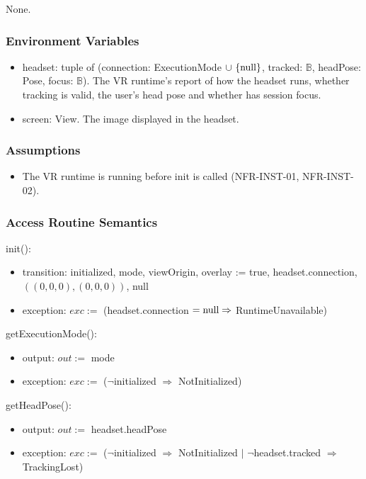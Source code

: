 \documentclass[12pt, titlepage]{article}
\newcommand{\True}{\textnormal{true}}
\newcommand{\nul}{\textnormal{null}}
\newcommand{\noinit}{$\neg$initialized $\Rightarrow$ NotInitialized}
\begin{document}
None.

\subsubsection{Environment Variables}

\begin{itemize}
\item headset: tuple of (connection: ExecutionMode $\cup \ \{\nul\}$, tracked:
  $\mathbb{B}$, headPose: Pose, focus: $\mathbb{B}$). The VR runtime's report
  of how the headset runs, whether tracking is valid, the user's head pose and
  whether \progname{} has session focus.
\item screen: View. The image displayed in the headset.
\end{itemize}

\subsubsection{Assumptions}

\begin{itemize}
\item The VR runtime is running before init is called (NFR-INST-01,
  NFR-INST-02).
\end{itemize}

\subsubsection{Access Routine Semantics}

\noindent init():
\begin{itemize}
\item transition: initialized, mode, viewOrigin, overlay := \True,
  headset.connection, $((0,0,0), (0,0,0))$, \nul
\item exception: $exc :=$ (headset.connection $= \nul \Rightarrow$
  RuntimeUnavailable)
\end{itemize}

\noindent getExecutionMode():
\begin{itemize}
\item output: $out :=$ mode
\item exception: $exc :=$ (\noinit)
\end{itemize}

\noindent getHeadPose():
\begin{itemize}
\item output: $out :=$ headset.headPose
\item exception: $exc :=$ (\noinit{} $|$ $\neg$headset.tracked $\Rightarrow$
  TrackingLost)
\end{itemize}
\end{document}
